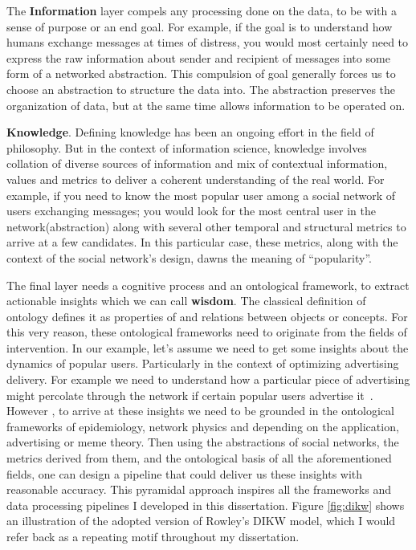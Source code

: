 The \textbf{Information} layer compels any processing done on the data, to be with a sense of purpose or an end goal. For example, if the goal is to understand how humans exchange messages at times of distress, you would most certainly need to express the raw information about sender and recipient of messages into some form of a networked abstraction. This compulsion of goal generally forces us to choose an abstraction to structure the data into. The abstraction preserves the organization of data, but at the same time allows information to be operated on.  

\textbf{Knowledge}. Defining knowledge has been an ongoing effort in the field of philosophy. But in the context of information science, knowledge involves collation of diverse sources of information and mix of contextual information, values and metrics to deliver a coherent understanding of the real world. For example, if you need to know the most popular user among a social network of users exchanging messages; you would look for the most central user in the network(abstraction) along with several other temporal and structural metrics to arrive at a few candidates. In this particular case, these metrics, along with the context of the social network's design, dawns the meaning of ``popularity''. 

The final layer needs a cognitive process and an ontological framework, to extract actionable insights which we can call \textbf{wisdom}. The classical definition of ontology defines it as properties of and relations between objects or concepts. For this very reason, these ontological frameworks need to originate from the fields of intervention.  In our example, let's assume we need to get some insights about the dynamics of popular users. Particularly in the context of optimizing advertising delivery. For example we need to understand how a particular piece of advertising might percolate through the network if certain popular users advertise it~\cite{li2012diffusion}. However , to arrive at these insights we need to be grounded in the ontological frameworks of epidemiology, network physics and depending on the application, advertising or meme theory. Then using the abstractions of social networks, the metrics derived from them, and the ontological basis of all the aforementioned fields, one can design a pipeline that could deliver us these insights with reasonable accuracy. This pyramidal approach inspires all the frameworks and data processing pipelines I developed in this dissertation. Figure \ref{fig:dikw} shows an illustration of the adopted version of Rowley's DIKW model, which I would refer back as a repeating motif throughout my dissertation.

